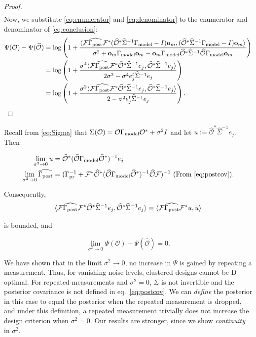 \documentclass[ba]{imsart}
\newcommand{\obs}{\mathcal{O}}
\newcommand{\fwd}{\mathcal{F}}
\newcommand{\obsm}{\widehat{\obs}}
\newcommand{\Sigmam}{\widehat{\Sigma}}
\newcommand{\postcovm}{\widehat{\Gamma_{\textup{post}}}}
\newcommand{\tar}{\Psi}
\newcommand{\meas}{\mathbf{o}}
\theoremstyle{plain}
\theoremstyle{definition}
\theoremstyle{remark}
\begin{document}
\begin{proof}
\begin{align}
  \end{align}
Now, we substitute \eqref{eq:enumerator} and \eqref{eq:denominator}
  to the enumerator and denominator of \eqref{eq:conclusion}:
\begin{align*}
    \tar( \obs ) - \tar (\obsm ) &=
    \log \left ( 1 + \frac{
      \langle \fwd \postcovm \fwd^* (\obsm^* \Sigmam^{-1} \modcov - I ) \meas_m,
      (\obsm^* \Sigmam^{-1} \modcov - I ) \meas_m \rangle
    }{
      \sigma^2 + \meas_m \modcov \meas_m - \meas_m \modcov \obsm^* \Sigmam^{-1} \obsm \modcov \meas_m 
    }       
    \right ) \\
&= \log \left ( 1 + \frac{\sigma^4
      \langle \fwd \postcovm \fwd^* \obsm^* \Sigmam^{-1} e_j,
      \obsm^* \Sigmam^{-1}e_j \rangle
    }{
      2\sigma^2 - \sigma^4 e_j^t\Sigmam^{-1}e_j 
    }       
    \right ) \\
&= \log \left ( 1 + \frac{\sigma^2
      \langle \fwd \postcovm \fwd^* \obsm^* \Sigmam^{-1} e_j,
      \obsm^* \Sigmam^{-1}e_j \rangle
    }{
      2 - \sigma^2 e_j^t\Sigmam^{-1}e_j 
    }       
    \right ).
  \end{align*}
\end{proof}


Recall from \eqref{eq:Sigma} that $\Sigma(\obs) = \obs
\modcov \obs^* + \sigma^2I$ and let $u := \obsm^*
\Sigmam^{-1}e_j$. Then

\begin{align*}
  \begin{split}
    \lim_{\sigma^2 \to 0} u &= \obsm^*(\obsm \modcov \obsm^*)^{-1}e_j\\
    \lim_{\sigma^2 \to 0} \postcovm &= (\prcov^{-1} + \fwd^* \obsm^* (\obsm \modcov \obsm^*)^{-1} \obsm \fwd)^{-1} \text{ (From \eqref{eq:postcov})}.
  \end{split}
\end{align*}

Consequently, 
\begin{equation*}
   \langle \fwd \postcovm \fwd^* \obsm^* \Sigmam^{-1}
    e_j, \obsm^* \Sigmam^{-1}e_j \rangle 
= \langle \fwd \postcovm \fwd^* u, u \rangle
\end{equation*}

is bounded, and

\begin{equation*}
\lim_{\sigma^2 \to 0} \tar(\obs) -\tar(\obsm) = 0.
\end{equation*}

We have shown that in the limit $\sigma^2 \to 0$, no increase in
$\tar$ is gained by repeating a measurement. Thus, for vanishing noise
levels, clustered designs cannot be D-optimal. For repeated
measurements and $\sigma^2=0$, $\Sigma$ is not invertible and the
posterior covariance is not defined in eq.~\eqref{eq:postcov}. We can
\emph{define} the posterior in this case to equal the posterior when
the repeated measurement is dropped, and under this definition, a
repeated measurement trivially does not increase the design criterion
when $\sigma^2=0$. Our results are stronger, since we show
\emph{continuity} in $\sigma^2$.
\end{document}
